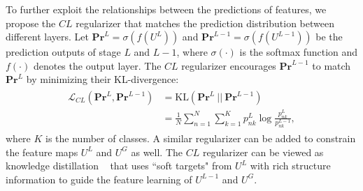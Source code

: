 \documentclass[10pt,twocolumn,letterpaper]{article}
\begin{document}
To further exploit the relationships between the predictions of features, we propose the $CL$ regularizer that matches the prediction distribution between different layers. Let $\mathbf{Pr}^L = \sigma(f(U^L))$ and $\mathbf{Pr}^{L-1}=\sigma(f(U^{L-1}))$ be the prediction outputs of stage $L$ and $L-1$, where $\sigma(\cdot)$ is the softmax function and $f(\cdot)$ denotes the output layer. 
The $CL$ regularizer encourages $\mathbf{Pr}^{L-1}$ to match $\mathbf{Pr}^{L}$ by minimizing their KL-divergence:
\begin{align}
\label{eq:klreg}
\begin{split}
\mathcal{L}_{CL}(\mathbf{Pr}^{L}, \mathbf{Pr}^{L-1})&= \text{KL}(\mathbf{Pr}^{L}\ ||\  \mathbf{Pr}^{L-1})\\
& =\frac{1}{N}\sum_{n=1}^{N}\sum_{k=1}^K p_{nk}^{L}\log \frac{p_{nk}^{L}}{p_{nk}^{L-1}},
\end{split}
\end{align}
where $K$ is the number of classes.
A similar regularizer can be added to constrain the feature maps $U^L$ and $U^G$ as well.
The $CL$ regularizer can be viewed as knowledge distillation ~\cite{distill15hinton} that uses ``soft targets" from $U^L$ with rich structure information to guide the feature learning of $U^{L-1}$ and $U^G$.
 
 
\end{document}
